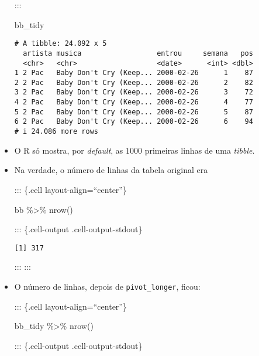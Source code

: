 \documentclass[
  letterpaper,
  DIV=11,
  numbers=noendperiod]{scrreprt}
\newenvironment{Shaded}{\begin{snugshade}}{\end{snugshade}}
\newcommand{\FunctionTok}[1]{\textcolor[rgb]{0.28,0.35,0.67}{#1}}
\newcommand{\NormalTok}[1]{\textcolor[rgb]{0.00,0.23,0.31}{#1}}
\newcommand{\SpecialCharTok}[1]{\textcolor[rgb]{0.37,0.37,0.37}{#1}}
\begin{document}
\begin{itemize}
  :::

\begin{Shaded}
\begin{Highlighting}[]
\NormalTok{bb\_tidy}
\end{Highlighting}
\end{Shaded}

\begin{verbatim}
# A tibble: 24.092 x 5
  artista musica                  entrou     semana   pos
  <chr>   <chr>                   <date>      <int> <dbl>
1 2 Pac   Baby Don't Cry (Keep... 2000-02-26      1    87
2 2 Pac   Baby Don't Cry (Keep... 2000-02-26      2    82
3 2 Pac   Baby Don't Cry (Keep... 2000-02-26      3    72
4 2 Pac   Baby Don't Cry (Keep... 2000-02-26      4    77
5 2 Pac   Baby Don't Cry (Keep... 2000-02-26      5    87
6 2 Pac   Baby Don't Cry (Keep... 2000-02-26      6    94
# i 24.086 more rows
\end{verbatim}
\item
  O R só mostra, por \emph{default}, as $1000$ primeiras linhas de uma
  \emph{tibble}.
\item
  Na verdade, o número de linhas da tabela original era

  ::: \{.cell layout-align=``center''\}

\begin{Shaded}
\begin{Highlighting}[]
\NormalTok{bb }\SpecialCharTok{\%\textgreater{}\%} \FunctionTok{nrow}\NormalTok{()}
\end{Highlighting}
\end{Shaded}

  ::: \{.cell-output .cell-output-stdout\}

\begin{verbatim}
[1] 317
\end{verbatim}

  ::: :::
\item
  O número de linhas, depois de \texttt{pivot\_longer}, ficou:

  ::: \{.cell layout-align=``center''\}

\begin{Shaded}
\begin{Highlighting}[]
\NormalTok{bb\_tidy }\SpecialCharTok{\%\textgreater{}\%} \FunctionTok{nrow}\NormalTok{()}
\end{Highlighting}
\end{Shaded}

  ::: \{.cell-output .cell-output-stdout\}


\end{itemize}
\end{document}
